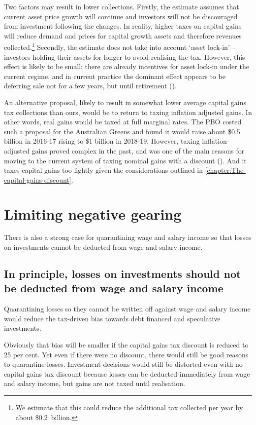 Two factors may result in lower collections. 
Firstly, the estimate assumes that current asset price growth will continue and investors will not be discouraged from investment following the changes. 
In reality, higher taxes on capital gains will reduce demand and prices for capital growth assets and therefore revenues collected.\footnote{We estimate that this could reduce the additional tax collected per year by about \$0.2~billion.} 
Secondly, the estimate does not take into account ‘asset lock-in’ – investors holding their assets for longer to avoid realising the tax. 
However, this effect is likely to be small: there are already incentives for asset lock-in under the current regime, and in current practice the dominant effect appears to be deferring sale not for a few years, but until retirement (). 

An alternative proposal, likely to result in somewhat lower average capital gains tax collections than ours, would be to return to taxing inflation adjusted gains.  
In other words, real gains would be taxed at full marginal rates. The PBO costed such a proposal for the Australian Greens and found it would raise about \$0.5 billion in 2016-17 rising to \$1 billion in 2018-19.  
However, taxing inflation-adjusted gains proved complex in the past, and was one of the main reasons for moving to the current system of taxing nominal gains with a discount (). 
And it taxes capital gains too lightly given the considerations outlined in \cref{chapter:The-capital-gains-discount}.

\section{Limiting negative gearing}
There is also a strong case for quarantining wage and salary income so that losses on investments cannot be deducted from wage and salary income. 
\subsection{In principle, losses on investments should not be deducted from wage and salary income}\label{subsec:In-principle-losses-should-not-be-deducted-from-salary}
Quarantining losses so they cannot be written off against wage and salary income would reduce the tax-driven bias towards debt financed and speculative investments. 

Obviously that bias will be smaller if the capital gains tax discount is reduced to 25 per cent. 
Yet even if there were no discount, there would still be good reasons to quarantine losses. Investment decisions would still be distorted even with no capital gains tax discount because losses can be deducted immediately from wage and salary income, but gains are not taxed until realisation.

